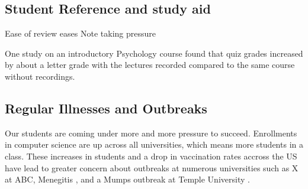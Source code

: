 \documentclass[sigconf]{acmart}
\begin{document}
\subsection{Student Reference and study aid}


Ease of review
eases Note taking pressure


One study \cite{shimoff2001effects}  on an introductory Psychology course found that quiz grades increased by about a letter grade with the lectures recorded compared to the same course without recordings.

\subsection{Regular Illnesses and Outbreaks}
Our students are coming under more and more pressure to succeed.  
Enrollments in computer science are up across all universities, which means more students in a class. 
These increases in students and a drop in vaccination rates accross the US have lead to greater concern about outbreaks at numerous universities such as X at ABC, Menegitis , and a Mumps outbreak at Temple University \cite{emezienna2019resurgence}.
\end{document}
